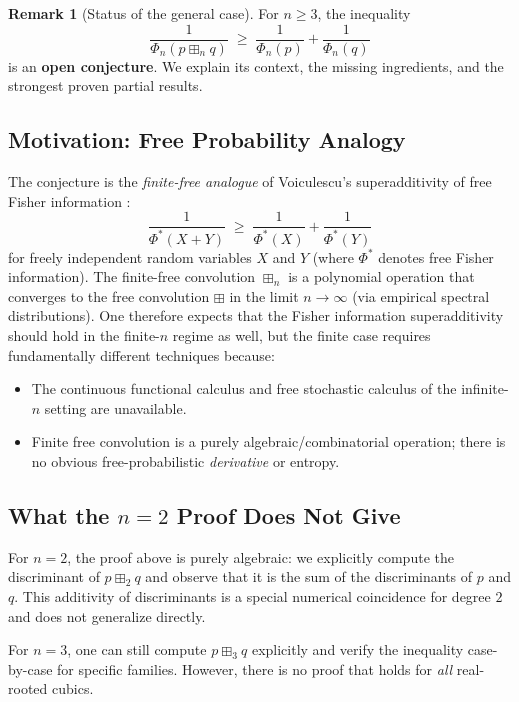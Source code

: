 \documentclass[12pt]{article}
\theoremstyle{definition}
\newtheorem{remark}[theorem]{Remark}
\begin{document}
\begin{remark}[Status of the general case]\label{rem:open}
For $n \ge 3$, the inequality
\[
  \frac{1}{\Phi_n(p \boxplus_n q)} \;\ge\; \frac{1}{\Phi_n(p)} + \frac{1}{\Phi_n(q)}
\]
is an \textbf{open conjecture}. We explain its context, the missing ingredients, and the strongest proven partial results.
\end{remark}

\subsection*{Motivation: Free Probability Analogy}

The conjecture is the \emph{finite-free analogue} of Voiculescu's superadditivity of free Fisher information \cite{Voiculescu98}:
\[
  \frac{1}{\Phi^*(X+Y)} \;\ge\; \frac{1}{\Phi^*(X)} + \frac{1}{\Phi^*(Y)}
\]
for freely independent random variables $X$ and $Y$ (where $\Phi^*$ denotes free Fisher information). The finite-free convolution $\boxplus_n$ is a polynomial operation that converges to the free convolution $\boxplus$ in the limit $n \to \infty$ (via empirical spectral distributions). One therefore expects that the Fisher information superadditivity should hold in the finite-$n$ regime as well, but the finite case requires fundamentally different techniques because:
\begin{itemize}
  \item The continuous functional calculus and free stochastic calculus of the infinite-$n$ setting are unavailable.
  \item Finite free convolution is a purely algebraic/combinatorial operation; there is no obvious free-probabilistic \emph{derivative} or entropy.
\end{itemize}

\subsection*{What the $n=2$ Proof Does Not Give}

For $n=2$, the proof above is purely algebraic: we explicitly compute the discriminant of $p \boxplus_2 q$ and observe that it is the sum of the discriminants of $p$ and $q$. This additivity of discriminants is a special numerical coincidence for degree $2$ and does not generalize directly.

For $n=3$, one can still compute $p \boxplus_3 q$ explicitly and verify the inequality case-by-case for specific families. However, there is no proof that holds for \emph{all} real-rooted cubics.
\end{document}
